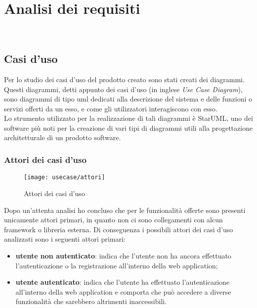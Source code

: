 
\chapter{Analisi dei requisiti}
\label{cap:analisi-requisiti}

\\

\section{Casi d'uso}
\label{sec:casi-uso}

Per lo studio dei casi d'uso del prodotto creato sono stati creati dei diagrammi.
Questi diagrammi, detti appunto dei casi d'uso (in inglese \emph{Use Case Diagram}), sono diagrammi di tipo \gls{uml} dedicati alla descrizione del sistema e delle funzioni o servizi offerti da un esso, e come gli utilizzatori interagiscono con esso.\\
Lo strumento utilizzato per la realizzazione di tali diagrammi è StarUML, uno dei software più noti per la creazione di vari tipi di diagrammi utili alla progettazione architetturale di un prodotto software.

\subsection{Attori dei casi d'uso}
\label{subsec:attori}

\begin{figure}[H] 
	\centering 
	\texttt{[image: usecase/attori]} 
	\caption{Attori dei casi d'uso}
\end{figure}
Dopo un'attenta analisi ho concluso che per le funzionalità offerte sono presenti unicamente attori primari, in quanto non ci sono collegamenti con alcun framework o libreria esterna.
Di conseguenza i possibili attori dei casi d'uso analizzati sono i seguenti attori primari:
\begin{itemize}
	\item \textbf{utente non autenticato}: indica che l'utente non ha ancora effettuato l'autenticazione o la registrazione all'interno della web application;
	\item \textbf{utente autenticato}: indica che l'utente ha effettuato l'autenticazione all'interno della web application e comporta che può accedere a diverse funzionalità che sarebbero altrimenti inaccessibili.
\end{itemize}

